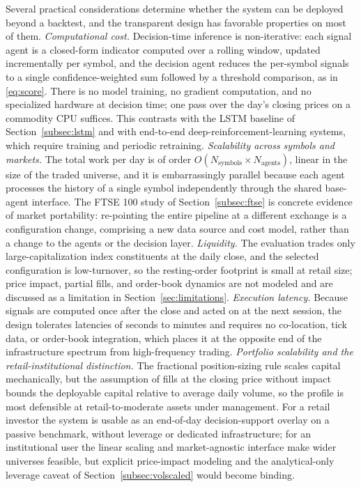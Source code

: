\documentclass{ieeeaccess}
\begin{document}
Several practical considerations determine whether the system can be deployed beyond a backtest, and the transparent design has favorable properties on most of them. \emph{Computational cost.} Decision-time inference is non-iterative: each signal agent is a closed-form indicator computed over a rolling window, updated incrementally per symbol, and the decision agent reduces the per-symbol signals to a single confidence-weighted sum followed by a threshold comparison, as in \eqref{eq:score}. There is no model training, no gradient computation, and no specialized hardware at decision time; one pass over the day's closing prices on a commodity CPU suffices. This contrasts with the LSTM baseline of Section~\ref{subsec:lstm} and with end-to-end deep-reinforcement-learning systems, which require training and periodic retraining. \emph{Scalability across symbols and markets.} The total work per day is of order $O(N_\text{symbols} \times N_\text{agents})$, linear in the size of the traded universe, and it is embarrassingly parallel because each agent processes the history of a single symbol independently through the shared base-agent interface. The FTSE 100 study of Section~\ref{subsec:ftse} is concrete evidence of market portability: re-pointing the entire pipeline at a different exchange is a configuration change, comprising a new data source and cost model, rather than a change to the agents or the decision layer. \emph{Liquidity.} The evaluation trades only large-capitalization index constituents at the daily close, and the selected configuration is low-turnover, so the resting-order footprint is small at retail size; price impact, partial fills, and order-book dynamics are not modeled and are discussed as a limitation in Section~\ref{sec:limitations}. \emph{Execution latency.} Because signals are computed once after the close and acted on at the next session, the design tolerates latencies of seconds to minutes and requires no co-location, tick data, or order-book integration, which places it at the opposite end of the infrastructure spectrum from high-frequency trading. \emph{Portfolio scalability and the retail-institutional distinction.} The fractional position-sizing rule scales capital mechanically, but the assumption of fills at the closing price without impact bounds the deployable capital relative to average daily volume, so the profile is most defensible at retail-to-moderate assets under management. For a retail investor the system is usable as an end-of-day decision-support overlay on a passive benchmark, without leverage or dedicated infrastructure; for an institutional user the linear scaling and market-agnostic interface make wider universes feasible, but explicit price-impact modeling and the analytical-only leverage caveat of Section~\ref{subsec:volscaled} would become binding.
\end{document}
